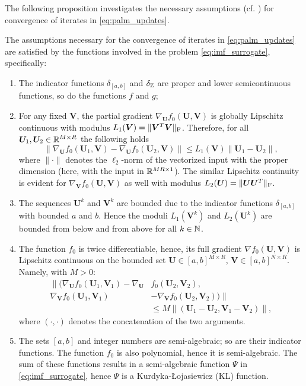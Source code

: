 The following proposition investigates the necessary assumptions (cf. \cite[Asm. 1 and Asm. 2]{bolte2014proximal}) for convergence of iterates in \eqref{eq:palm_updates}.
\begin{proposition}\label{prop:assumptions}
    The assumptions necessary for the convergence of iterates in \eqref{eq:palm_updates} are satisfied by the functions involved in the problem \eqref{eq:imf_surrogate}, specifically:
    \begin{enumerate}
        \item The indicator functions $\delta_{[a,b]}$ and $\delta_{\mathbb{Z}}$ are proper and lower semicontinuous functions, so do the functions $f$ and $g$;
        \item For any fixed $\bm V$, the partial gradient $\nabla_{\bm U} f_0(\bm U, \bm V)$ is globally Lipschitz continuous with modulus $L_1(\bm V) = \|\bm V^T \bm V\|_{\rm F}$. Therefore, for all $\bm U_1,\bm U_2 \in \mathbb{R}^{M\times R}$ the following holds
              \begin{equation*}
                  \|\nabla_{\bm U} f_0(\bm U_1, \bm V) - \nabla_{\bm U} f_0(\bm U_2, \bm V)\| \leq L_1(\bm V) \|\bm U_1 - \bm U_2\|,
              \end{equation*}
              where $\|\cdot\|$ denotes the $\ell_2$-norm of the vectorized input with the proper dimension (here, with the input in $\mathbb{R}^{MR\times 1}$).
              The similar Lipschitz continuity is evident for $\nabla_{\bm V} f_0(\bm U, \bm V)$ as well with modulus $L_2(\bm U) = \|\bm U \bm U^T\|_{\rm F}$.
        \item The sequences $\bm U^k$ and $\bm V^k$ are bounded due to the indicator functions $\delta_{[a,b]}$ with bounded $a$ and $b$. Hence the moduli $L_1(\bm V^k)$ and $L_2(\bm U^k)$ are bounded from below and from above for all $k\in\mathbb{N}$.
        \item The function $f_0$ is twice differentiable, hence, its full gradient $\nabla f_0(\bm U,\bm V)$ is Lipschitz continuous on the bounded set $\bm U \in [a,b]^{M\times R}$, $\bm V \in [a,b]^{N\times R}$. Namely, with $M > 0$:
              \begin{align*}
                  \|\big(\nabla_{\bm U} f_0(\bm U_1, \bm V_1) - \nabla_{\bm U} & f_0(\bm U_2, \bm V_2),                             \\
                  \nabla_{\bm V} f_0(\bm U_1, \bm V_1)                         & - \nabla_{\bm V} f_0(\bm U_2, \bm V_2)\big)\|      \\
                                                                               & \leq M \|(\bm U_1 - \bm U_2, \bm V_1 - \bm V_2)\|,
              \end{align*}
              where $(\cdot,\cdot)$ denotes the concatenation of the two arguments.
        \item The sets $[a,b]$ and integer numbers are semi-algebraic; so are their indicator functions. The function $f_0$ is also polynomial, hence it is semi-algebraic. The sum of these functions results in a semi-algebraic function $\Psi$ in \eqref{eq:imf_surrogate}, hence $\Psi$ is a Kurdyka-Łojasiewicz (KL) function.
    \end{enumerate}
\end{proposition}

